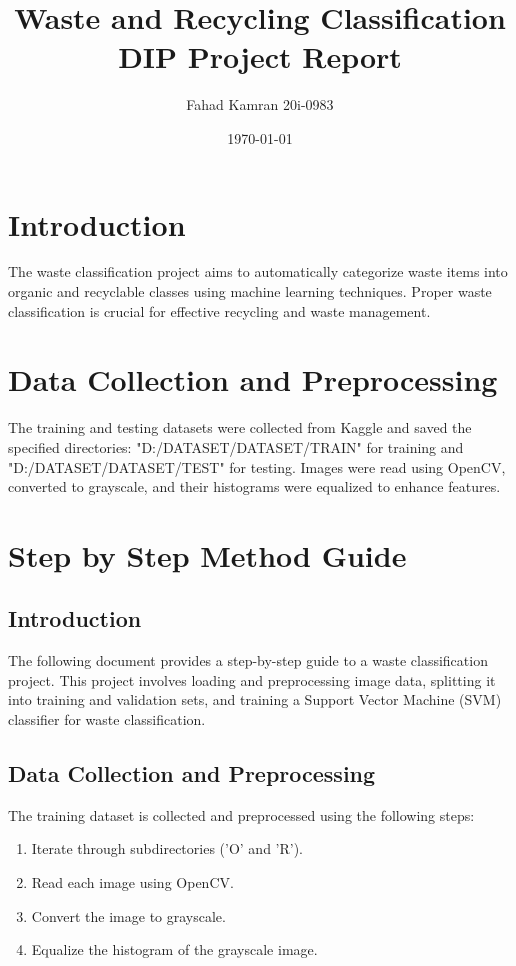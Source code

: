 \documentclass{article}
\begin{document}
\title{Waste and Recycling Classification DIP Project Report}
\author{Fahad Kamran 20i-0983}
\date{\today}
\maketitle

\section{Introduction}
The waste classification project aims to automatically categorize waste items into organic and recyclable classes using machine learning techniques. Proper waste classification is crucial for effective recycling and waste management.

\section{Data Collection and Preprocessing}
The training and testing datasets were collected from Kaggle and saved the specified directories: "D:/DATASET/DATASET/TRAIN" for training and "D:/DATASET/DATASET/TEST" for testing. Images were read using OpenCV, converted to grayscale, and their histograms were equalized to enhance features.

\section{Step by Step Method Guide}
\subsection{Introduction}
The following document provides a step-by-step guide to a waste classification project. This project involves loading and preprocessing image data, splitting it into training and validation sets, and training a Support Vector Machine (SVM) classifier for waste classification.
\subsection{Data Collection and Preprocessing}
The training dataset is collected and preprocessed using the following steps:

\begin{enumerate}
    \item Iterate through subdirectories ('O' and 'R').
    \item Read each image using OpenCV.
    \item Convert the image to grayscale.
    \item Equalize the histogram of the grayscale image.
\end{enumerate}
\end{document}
